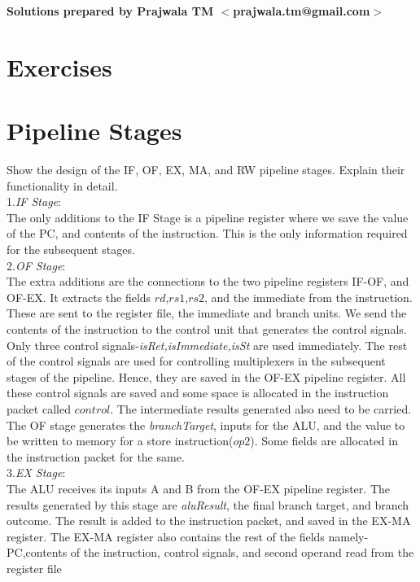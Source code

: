 \begin{flushright}
\textbf{Solutions prepared by Prajwala TM $<$prajwala.tm@gmail.com$>$}
\end{flushright}
\section*{Exercises}
\vskip 1cm

\setcounter{Exercise}{0}
\setcounter{Answer}{0}

\section*{Pipeline Stages}

\begin{ExerciseList}

\Exercise
Show the design of the IF, OF, EX, MA, and RW pipeline stages.
Explain their functionality in detail.
\Answer
\hspace{3mm} \\
1.\textit{IF Stage}:\\
The only additions to the IF Stage is a pipeline register where we save the value of the PC, and contents of the instruction. This is the only information required for the subsequent stages. \\
2.\textit{OF Stage}: \\
The extra additions are the connections to the two pipeline registers IF-OF, and OF-EX. It extracts the fields $rd$,$rs1$,$rs2$, and the immediate from the instruction. These are sent to the register file, the immediate and branch units. We send the contents of the instruction to the control unit that generates the control signals. Only three control signals-\textit{isRet,isImmediate,isSt} are used immediately. The rest of the control signals are used for controlling multiplexers in the subsequent stages of the pipeline. Hence, they are saved in the OF-EX pipeline register. All these control signals are saved and some space is allocated in the instruction packet called $control$. The intermediate results generated also need to be carried. The OF stage generates the \textit{branchTarget}, inputs for the ALU, and the value to be written to memory for a store instruction($op2$). Some fields are allocated in the instruction packet for the same.\\
3.\textit{EX Stage}: \\
The ALU receives its inputs A and B from the OF-EX pipeline register. The results generated by this stage are \textit{aluResult}, the final branch target, and branch outcome. The result is added to the instruction packet, and saved in the EX-MA register. The EX-MA register also contains the rest of the fields namely-PC,contents of the instruction, control signals, and second operand read from the register file

\end{ExerciseList}
